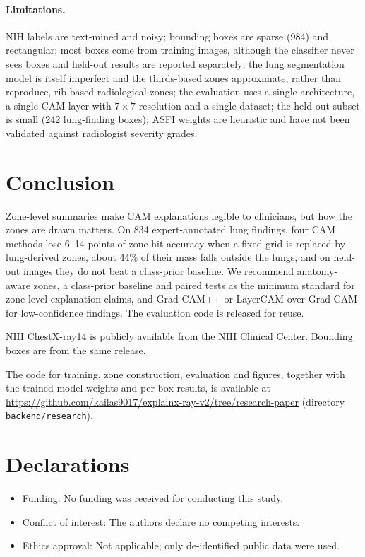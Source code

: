 \documentclass[pdflatex,sn-mathphys-num]{sn-jnl}
\begin{document}
\paragraph{Limitations.} NIH labels are text-mined and noisy; bounding boxes are sparse (984) and rectangular; most boxes come from training images, although the classifier never sees boxes and held-out results are reported separately; the lung segmentation model is itself imperfect and the thirds-based zones approximate, rather than reproduce, rib-based radiological zones; the evaluation uses a single architecture, a single CAM layer with $7\times7$ resolution and a single dataset; the held-out subset is small (242 lung-finding boxes); ASFI weights are heuristic and have not been validated against radiologist severity grades.

\section{Conclusion}\label{sec:conclusion}
Zone-level summaries make CAM explanations legible to clinicians, but how the zones are drawn matters. On 834 expert-annotated lung findings, four CAM methods lose 6--14 points of zone-hit accuracy when a fixed grid is replaced by lung-derived zones, about 44\% of their mass falls outside the lungs, and on held-out images they do not beat a class-prior baseline. We recommend anatomy-aware zones, a class-prior baseline and paired tests as the minimum standard for zone-level explanation claims, and Grad-CAM++ or LayerCAM over Grad-CAM for low-confidence findings. The evaluation code is released for reuse.

\backmatter

 NIH ChestX-ray14 is publicly available from the NIH Clinical Center. Bounding boxes are from the same release.

 The code for training, zone construction, evaluation and figures, together with the trained model weights and per-box results, is available at \url{https://github.com/kailas9017/explainx-ray-v2/tree/research-paper} (directory \texttt{backend/research}).

\section*{Declarations}
\begin{itemize}
\item Funding: No funding was received for conducting this study.
\item Conflict of interest: The authors declare no competing interests.
\item Ethics approval: Not applicable; only de-identified public data were used.
\end{itemize}


\end{document}
